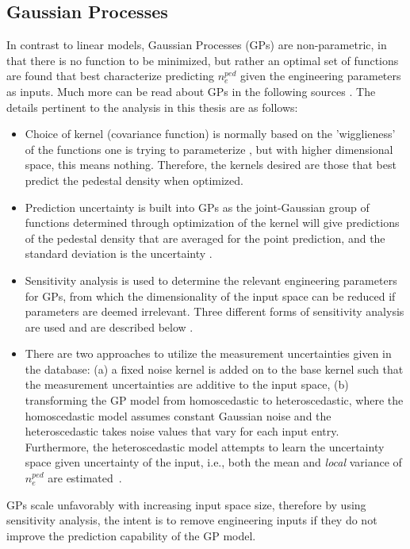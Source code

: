 \documentclass[a4paper, twoside, final, 12pt]{article}
\begin{document}
\subsection{Gaussian Processes}
In contrast to linear models, Gaussian Processes (GPs) are non-parametric, in that there is no function to be minimized, but rather an optimal set of functions are found that best characterize predicting $n_e^{ped}$ given the engineering parameters as inputs.
Much more can be read about GPs in the following sources \cite{gortler2019a, Rasmussen2004, vapnik95}.
The details pertinent to the analysis in this thesis are as follows:
\begin{itemize}
	\item Choice of kernel (covariance function) is normally based on the 'wigglieness' of the functions one is trying to parameterize \cite{cov-matrix-maths}, but with higher dimensional space, this means nothing. Therefore, the kernels desired are those that best predict the pedestal density when optimized.
	\item Prediction uncertainty is built into GPs as the joint-Gaussian group of functions determined through optimization of the kernel will give predictions of the pedestal density that are averaged for the point prediction, and the standard deviation is the uncertainty \cite{Rasmussen2004}. 
	\item Sensitivity analysis is used to determine the relevant engineering parameters for GPs, from which the dimensionality of the input space can be reduced if parameters are deemed irrelevant. Three different forms of sensitivity analysis are used and are described below \cite{pmlr-v89-paananen19a}. 
	\item There are two approaches to utilize the measurement uncertainties given in the database: (a) a fixed noise kernel is added on to the base kernel such that the measurement uncertainties are additive to the input space, (b) transforming the GP model from homoscedastic to heteroscedastic, where the homoscedastic model assumes constant Gaussian noise and the heteroscedastic takes noise values that vary for each input entry. Furthermore, the heteroscedastic model attempts to learn the uncertainty space given uncertainty of the input, i.e., both the mean and \textit{local} variance of $n_e^{ped}$ are estimated~\cite{heteroscedastic}.   
\end{itemize}

GPs scale unfavorably with increasing input space size, therefore by using sensitivity analysis, the intent is to remove engineering inputs if they do not improve the prediction capability of the GP model.
\end{document}
